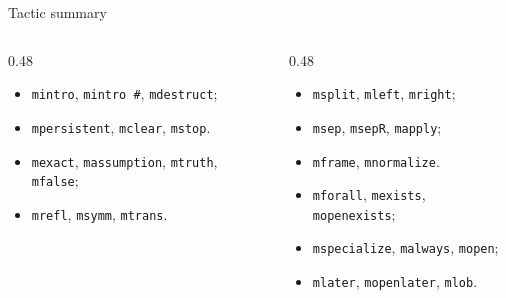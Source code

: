 \documentclass[10pt,aspectratio=169]{beamer}
\begin{document}
\begin{frame}{Tactic summary}
  \begin{columns}[T,onlytextwidth]
    \begin{column}{0.48\textwidth}
      \begin{itemize}
        \item \texttt{mintro}, \texttt{mintro \#}, \texttt{mdestruct};
        \item \texttt{mpersistent}, \texttt{mclear}, \texttt{mstop}.
      \end{itemize}

      \begin{itemize}
        \item \texttt{mexact}, \texttt{massumption}, \texttt{mtruth}, \texttt{mfalse};
        \item \texttt{mrefl}, \texttt{msymm}, \texttt{mtrans}.
      \end{itemize}
    \end{column}
    \begin{column}{0.48\textwidth}
      \begin{itemize}
        \item \texttt{msplit}, \texttt{mleft}, \texttt{mright};
        \item \texttt{msep}, \texttt{msepR}, \texttt{mapply};
        \item \texttt{mframe}, \texttt{mnormalize}.
      \end{itemize}

      \begin{itemize}
        \item \texttt{mforall}, \texttt{mexists}, \texttt{mopenexists};
        \item \texttt{mspecialize}, \texttt{malways}, \texttt{mopen};
        \item \texttt{mlater}, \texttt{mopenlater}, \texttt{mlob}.
      \end{itemize}
    \end{column}
  \end{columns}

  \vfill
\end{frame}
\end{document}
